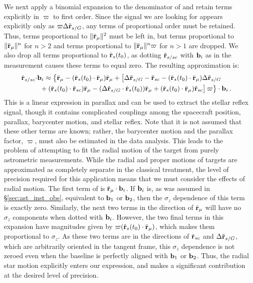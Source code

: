We next apply a binomial expansion to the denominator of  and retain terms explicitly in $\varpi$ to first order.  Since the signal we are looking for appears explicitly only as $\varpi\Delta \tilde{\mathbf{r}}_{s/G}$, any terms of proportional order must be retained.  Thus, terms proportional to $\Vert \bar{\mathbf{r}}_\mu \Vert^2$ must be left in, but terms proportional to $\Vert \bar{\mathbf{r}}_\mu \Vert^n$ for $n > 2$ and terms proportional to $\Vert \bar{\mathbf{r}}_\mu \Vert^n\varpi$ for $n > 1$ are dropped.  We also drop all terms proportional to $\hat{\mathbf{r}}_s(t_0)$, as dotting $\hat{\mathbf{r}}_{s/sc}$ with $\mathbf b_i$ as in the measurement  causes these terms to equal zero.  The resulting approximation is:
\begin{equation}\label{eq:rhat_expand1}
\begin{split}
\hat{\mathbf{r}}_{s/sc}\cdot &\mathbf b_i \approx
\left\{\bar{\mathbf{r}}_\mu  - (\hat{\mathbf{r}}_s(t_0) \cdot \bar{\mathbf{r}}_\mu)\bar{\mathbf{r}}_\mu +  \left[\Delta \tilde{\mathbf{r}}_{s/G}  - \tilde {\mathbf{r}}_{sc}  -(\hat{\mathbf{r}}_s(t_0)\cdot\bar{\mathbf{r}}_\mu)\Delta \tilde{\mathbf{r}}_{s/G}\right.\right.\\
&\left.\left.{} + (\hat{\mathbf{r}}_s(t_0) \cdot \tilde{\mathbf{r}}_{sc}) \bar{\mathbf{r}}_\mu - (\Delta\tilde{\mathbf{r}}_{s/G} \cdot \hat{\mathbf{r}}_s(t_0))\bar{\mathbf{r}}_\mu +(\hat{\mathbf{r}}_s(t_0)\cdot\bar{\mathbf{r}}_\mu)\tilde {\mathbf{r}}_{sc}\right]\varpi \right\} \cdot \mathbf b_i \,.
\end{split}
\end{equation}
This is  a linear expression in parallax and can be used to extract the stellar reflex signal, though it contains complicated couplings among the spacecraft position, parallax, barycenter motion, and stellar reflex.  Note that it is not assumed that these other terms are known; rather, the barycenter motion and the parallax factor, $\varpi$, must also be estimated in the data analysis.  This leads to the problem of attempting to fit the radial motion of the target from purely astrometric measurements.  While the radial and proper motions of targets are approximated as completely separate in the classical treatment, the level of precision required for this application means that we must consider the effects of radial motion.  The first term of  is $\bar{\mathbf{r}}_\mu \cdot \mathbf b_i$.  If $\mathbf b_i$ is, as was assumed in \S\ref{sec:ast_inst_obs}, equivalent to $\mathbf b_1$ or $\mathbf b_2$, then the $\sigma_z$ dependence of this term is exactly zero.  Similarly, the next two terms in the direction of $\bar{\mathbf{r}}_\mu$ will have no $\sigma_z$ components when dotted with $\mathbf b_i$.  However, the two final terms in this expansion have magnitudes given by $\varpi  (\hat{\mathbf{r}}_s(t_0)\cdot\bar{\mathbf{r}}_\mu)$, which makes them proportional to $\sigma_z$.  As these two terms are in the directions of $ \tilde {\mathbf{r}}_{sc}$ and $\Delta \tilde{\mathbf{r}}_{s/G}$, which are arbitrarily oriented in the tangent frame, this $\sigma_z$ dependence is not zeroed even when the baseline is perfectly aligned with $\mathbf b_1$ or $\mathbf b_2$.  Thus, the radial star motion explicitly enters our expression, and makes a significant contribution at the desired level of precision.


